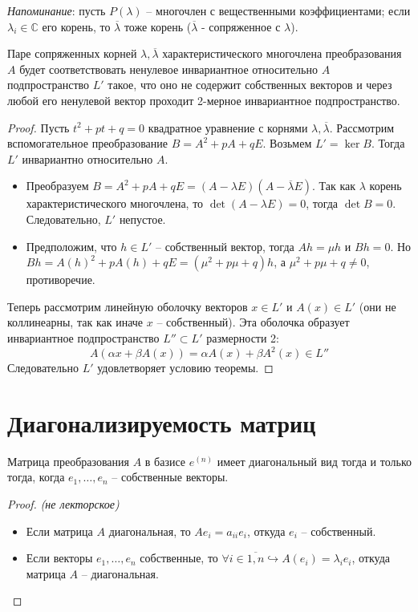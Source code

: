 \textit{Напоминание}: пусть $P(\lambda)$ -- многочлен с вещественными коэффициентами; если $\lambda_i \in \mathbb{C}$ его корень, то $\overline\lambda$ тоже корень ($\overline\lambda$ - сопряженное с $\lambda$).
\begin{theorem}
    Паре сопряженных корней $\lambda, \overline{\lambda}$ характеристического многочлена преобразования $A$ будет соответствовать ненулевое инвариантное относительно $A$ подпространство $L'$ такое, что оно не содержит собственных векторов и через любой его ненулевой вектор проходит 2-мерное инвариантное подпространство.
\end{theorem}
\begin{proof}
    Пусть $t^2+pt+q=0$ квадратное уравнение с корнями $\lambda, \overline{\lambda}$. Рассмотрим вспомогательное преобразование $B=A^2+pA+qE$. Возьмем $L'=\ker B$. Тогда $L'$ инвариантно относительно $A$.
    \begin{itemize}
        \item Преобразуем $B=A^2+pA+qE=(A-\lambda E)(A-\overline{\lambda}E)$. Так как $\lambda$ корень характеристического многочлена, то $\det (A-\lambda E)=0$, тогда $\det B=0$. Следовательно, $L'$ непустое.
        \item Предположим, что $h\in L'$ -- собственный вектор, тогда $Ah=\mu h$ и $Bh=0$. Но $Bh=A(h)^2+pA(h)+qE=(\mu^2+p\mu+q)h$, а $\mu^2+p\mu+q \neq 0$, противоречие.
    \end{itemize}
    Теперь рассмотрим линейную оболочку векторов $x\in L'$ и $A(x)\in L'$ (они не коллинеарны, так как иначе $x$ -- собственный). Эта оболочка образует инвариантное подпространство $L''\subset L'$ размерности 2:
    \[A(\alpha x+\beta A(x))=\alpha A(x)+\beta A^2(x)\in L''\]
    Следовательно $L'$ удовлетворяет условию теоремы.
\end{proof}

\section{Диагонализируемость матриц}
\begin{theorem}
    Матрица преобразования $A$ в базисе $e^{(n)}$ имеет диагональный вид тогда и только тогда, когда $e_1, \dots, e_n$ -- собственные векторы.
\end{theorem}
\begin{proof} \textit{(не лекторское)}
    \begin{itemize}
        \item[$\Rightarrow$] Если матрица $A$ диагональная, то $Ae_i=a_{ii}e_i$, откуда $e_i$ -- собственный.
        \item [$\Leftarrow$] Если векторы $e_1, \dots, e_n$ собственные, то $\forall i\in \overline{1,n} \hookrightarrow A(e_i)=\lambda_i e_i$, откуда матрица $A$ -- диагональная.
    \end{itemize}
\end{proof}
